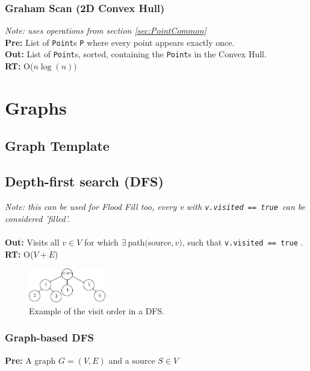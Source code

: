 \documentclass[a4paper,10pt]{article}
\begin{document}
\begin{multicols}{2}
\subsubsection{Graham Scan (2D Convex Hull)}
\textit{Note: uses operations from section \ref{sec:PointCommon}}\\
\textbf{Pre:} List of \lstinline|Point|s \lstinline|P| where every point appears exactly once.\\
\textbf{Out:} List of \lstinline|Point|s, sorted, containing the \lstinline|Point|s in the Convex Hull.\\
\textbf{RT:} O($n\log(n))$

\section{Graphs}
\subsection{Graph Template}


\subsection{Depth-first search (DFS)}\label{sec:DFS}
\textit{Note: this can be used for Flood Fill too, every v with \lstinline|v.visited == true|\noindent\ can be considered 'filled'.}\\\\
\textbf{Out:} Visits all $v\in V$ for which $\exists\ $path$($source$, v)$, such that \lstinline|v.visited == true|%
.\\
\textbf{RT:} O($V+E$)\vspace{-15pt}
\begin{figure}[H]
\centering
\includegraphics[width=0.3\textwidth]{figures/dfsvisit.eps}
\caption{Example of the visit order in a DFS.}
\end{figure}
\vspace{-12pt}\subsubsection{Graph-based DFS}
\textbf{Pre:} A graph $G=(V,E)$ and a source $S\in V$


\end{multicols}
\end{document}
